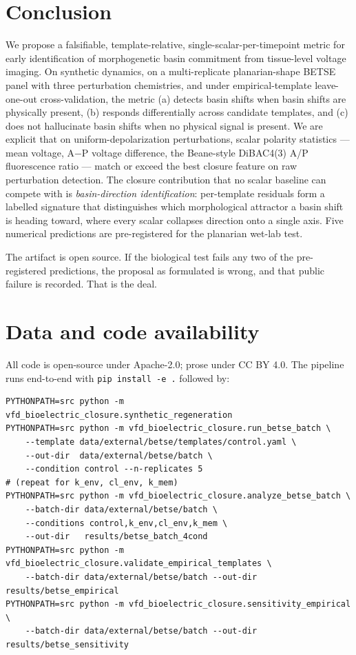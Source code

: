 \documentclass[11pt,a4paper]{article}
\begin{document}
\section{Conclusion}

We propose a falsifiable, template-relative, single-scalar-per-timepoint metric for early identification of morphogenetic basin commitment from tissue-level voltage imaging. On synthetic dynamics, on a multi-replicate planarian-shape BETSE panel with three perturbation chemistries, and under empirical-template leave-one-out cross-validation, the metric (a) detects basin shifts when basin shifts are physically present, (b) responds differentially across candidate templates, and (c) does not hallucinate basin shifts when no physical signal is present. We are explicit that on uniform-depolarization perturbations, scalar polarity statistics --- mean voltage, A$-$P voltage difference, the Beane-style DiBAC4(3) A/P fluorescence ratio --- match or exceed the best closure feature on raw perturbation detection. The closure contribution that no scalar baseline can compete with is \emph{basin-direction identification}: per-template residuals form a labelled signature that distinguishes which morphological attractor a basin shift is heading toward, where every scalar collapses direction onto a single axis. Five numerical predictions are pre-registered for the planarian wet-lab test.

The artifact is open source. If the biological test fails any two of the pre-registered predictions, the proposal as formulated is wrong, and that public failure is recorded. That is the deal.

\section*{Data and code availability}

All code is open-source under Apache-2.0; prose under CC BY 4.0. The pipeline runs end-to-end with \texttt{pip install -e .} followed by:

\begin{verbatim}
PYTHONPATH=src python -m vfd_bioelectric_closure.synthetic_regeneration
PYTHONPATH=src python -m vfd_bioelectric_closure.run_betse_batch \
    --template data/external/betse/templates/control.yaml \
    --out-dir  data/external/betse/batch \
    --condition control --n-replicates 5
# (repeat for k_env, cl_env, k_mem)
PYTHONPATH=src python -m vfd_bioelectric_closure.analyze_betse_batch \
    --batch-dir data/external/betse/batch \
    --conditions control,k_env,cl_env,k_mem \
    --out-dir   results/betse_batch_4cond
PYTHONPATH=src python -m vfd_bioelectric_closure.validate_empirical_templates \
    --batch-dir data/external/betse/batch --out-dir results/betse_empirical
PYTHONPATH=src python -m vfd_bioelectric_closure.sensitivity_empirical \
    --batch-dir data/external/betse/batch --out-dir results/betse_sensitivity
\end{verbatim}
\end{document}
